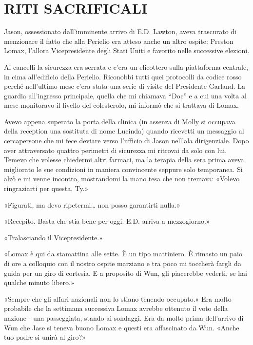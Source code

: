 \chapter{RITI SACRIFICALI}\label{riti-sacrificali}

\hfill\break

Jason, ossessionato dall'imminente arrivo di E.D. Lawton, aveva
trascurato di menzionare il fatto che alla Perielio era atteso anche un
altro ospite: Preston Lomax, l'allora Vicepresidente degli Stati Uniti e
favorito nelle successive elezioni.

Ai cancelli la sicurezza era serrata e c'era un elicottero sulla
piattaforma centrale, in cima all'edificio della Perielio. Riconobbi
tutti quei protocolli da codice rosso perché nell'ultimo mese c'era
stata una serie di visite del Presidente Garland. La guardia
all'ingresso principale, quella che mi chiamava ``Doc'' e a cui una
volta al mese monitoravo il livello del colesterolo, mi informò che si
trattava di Lomax.

Avevo appena superato la porta della clinica (in assenza di Molly si
occupava della reception una sostituta di nome Lucinda) quando ricevetti
un messaggio al cercapersone che mi fece deviare verso l'ufficio di
Jason nell'ala dirigenziale. Dopo aver attraversato quattro perimetri di
sicurezza mi ritrovai da solo con lui. Temevo che volesse chiedermi
altri farmaci, ma la terapia della sera prima aveva migliorato le sue
condizioni in maniera convincente seppure solo temporanea. Si alzò e mi
venne incontro, mostrandomi la mano tesa che non tremava: «Volevo
ringraziarti per questa, Ty.»

«Figurati, ma devo ripetermi\ldots{} non posso garantirti nulla.»

«Recepito. Basta che stia bene per oggi. E.D. arriva a mezzogiorno.»

«Tralasciando il Vicepresidente.»

«Lomax è qui da stamattina alle sette. È un tipo mattiniero. È rimasto
un paio di ore a colloquio con il nostro ospite marziano e tra poco mi
toccherà fargli da guida per un giro di cortesia. E a proposito di Wun,
gli piacerebbe vederti, se hai qualche minuto libero.»

«Sempre che gli affari nazionali non lo stiano tenendo occupato.» Era
molto probabile che la settimana successiva Lomax avrebbe ottenuto il
voto della nazione - una passeggiata, stando ai sondaggi. Era da molto
prima dell'arrivo di Wun che Jase si teneva buono Lomax e questi era
affascinato da Wun. «Anche tuo padre si unirà al giro?»


